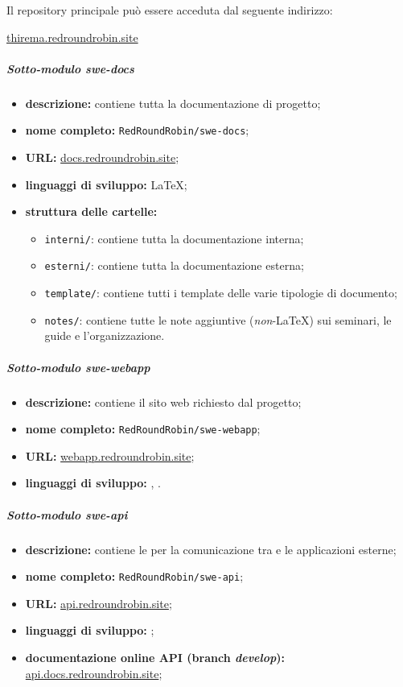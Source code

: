 		Il repository principale può essere acceduta dal seguente indirizzo:

		\href{https://github.com/RedRoundRobin/swe-thirema}{thirema.redroundrobin.site}

		\subparagraph{Sotto-modulo swe-docs}

		\begin{itemize}
		 	\item \textbf{descrizione:} contiene tutta la documentazione di progetto;
		 	\item \textbf{nome completo:} \verb!RedRoundRobin/swe-docs!;
		 	\item \textbf{URL:} \href{https://github.com/RedRoundRobin/swe-docs}{docs.redroundrobin.site};
		 	\item \textbf{linguaggi di sviluppo:} \LaTeX{};
		 	\item \textbf{struttura delle cartelle:}
			\begin{itemize}
				\item \verb!interni/!: contiene tutta la documentazione interna;
				\item \verb!esterni/!: contiene tutta la documentazione esterna;
				\item \verb!template/!: contiene tutti i template delle varie tipologie di documento;
				\item \verb!notes/!: contiene tutte le note aggiuntive (\textit{non}-\LaTeX{}) sui seminari, le guide e l'organizzazione.
			\end{itemize}
		 \end{itemize}

		\subparagraph{Sotto-modulo swe-webapp}

		\begin{itemize}
		 	\item \textbf{descrizione:} contiene il sito web richiesto dal progetto;
		 	\item \textbf{nome completo:} \verb!RedRoundRobin/swe-webapp!;
		 	\item \textbf{URL:} \href{https://github.com/RedRoundRobin/swe-webapp}{webapp.redroundrobin.site};
		 	\item \textbf{linguaggi di sviluppo:} , .
		 \end{itemize}

		\subparagraph{Sotto-modulo swe-api}

		\begin{itemize}
		 	\item \textbf{descrizione:} contiene le  per la comunicazione tra  e le applicazioni esterne;
		 	\item \textbf{nome completo:} \verb!RedRoundRobin/swe-api!;
		 	\item \textbf{URL:} \href{https://github.com/RedRoundRobin/swe-api}{api.redroundrobin.site};
		 	\item \textbf{linguaggi di sviluppo:} ;
		 	\item \textbf{documentazione online API (branch \textit{develop}):} \href{http://redroundrobin.github.io/api-docs}{api.docs.redroundrobin.site};
		 \end{itemize}

